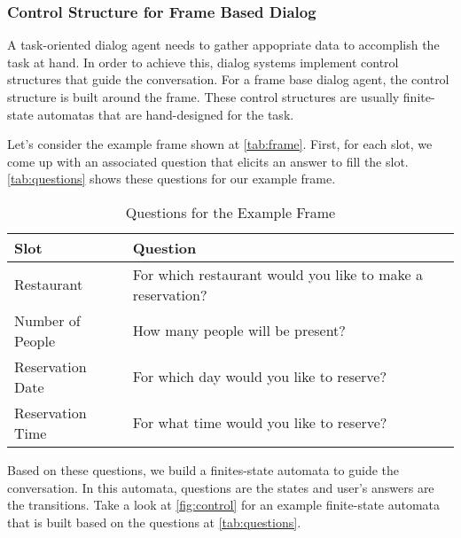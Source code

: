 \subsubsection{Control Structure for Frame Based Dialog}
A task-oriented dialog agent needs to gather appopriate data to accomplish the task at hand.
In order to achieve this, dialog systems implement control structures that guide the conversation.
For a frame base dialog agent, the control structure is built around the frame.
These control structures are usually finite-state automatas that are hand-designed for the task. 

Let's consider the example frame shown at \autoref{tab:frame}.
First, for each slot, we come up with an associated question that elicits an answer to fill the slot.
\autoref{tab:questions} shows these questions for our example frame.

\begin{table}[htbp]
  \caption[Questions for the Example Frame]{Questions for the Example Frame}\label{tab:questions}
  \centering
  \begin{tabular}{l|l}
    Slot&Question\\ \toprule
    Restaurant&For which restaurant would you like to make a reservation?\\ \hline
    Number of People&How many people will be present?\\ \hline
    Reservation Date&For which day would you like to reserve?\\ \hline
    Reservation Time&For what time would you like to reserve?\\ \hline
  \end{tabular}
\end{table}

Based on these questions, we build a finites-state automata to guide the conversation.
In this automata, questions are the states and user's answers are the transitions.
Take a look at \autoref{fig:control} for an example finite-state automata that is built based on the questions at \autoref{tab:questions}.

